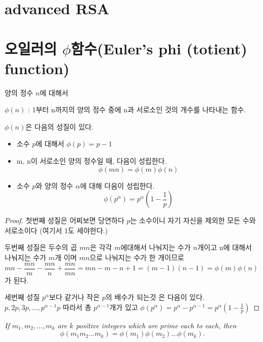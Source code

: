 \section{advanced RSA}

\section{오일러의 $\phi$함수(Euler’s phi (totient) function)}
\begin{dfn}
    양의 정수 $n$에 대해서 

    $\phi (n)$ : 1부터 n까지의 양의 정수 중에 n과 서로소인 것의 개수를 나타내는 함수.    
\end{dfn}

$\phi (n)$은 다음의 성질이 있다.

\begin{theorem}
    \begin{itemize}
        \item{소수 $p$에 대해서  $\phi (p)=p-1$}
        
        \item{ m, n이 서로소인 양의 정수일 때, 다음이 성립한다. \[\phi (mn)=\phi (m)\phi (n)\]}
        
        \item 소수 $p$와 양의 정수 $\alpha$에 대해 다음이 성립한다.
        $$\phi(p^\alpha) = p^\alpha \left ( 1 - \frac{1}{p} \right )$$
        \end{itemize}
\end{theorem}

\begin{proof}

첫번째 성질은 어찌보면 당연하다 $p$는 소수이니 자기 자신을 제외한 모든 수와 서로소이다 (여기서 1도 세야한다.)


두번째 성질은 두수의 곱 $mn$은 각각 $m$에대해서 나눠지는 수가 $n$개이고 n에 대해서 나눠지는 수가 $m$개 이며 $mn$으로 나눠지는 수가 한 개이므로 
$mn -\dfrac{mn}{m}-\dfrac{mn}{n}+\dfrac{mn}{mn} =mn -m -n +1=(m-1)(n-1)=\phi (m)\phi(n)$가 된다.

세번째 성질 $p^\alpha$보다 같거나 작은 $p$의 배수가 되는것 은 다음이 있다.
$p , 2p , 3p , ... , p^{\alpha-1}p$
따라서 총 $p^{\alpha-1}$개가 있고 
$ \phi(p^\alpha) =p^{\alpha} -  p^{\alpha-1} = p^\alpha \left ( 1 - \frac{1}{p} \right )$

\end{proof}

\begin{corollary}
    \emph{If $m_1, m_2, \ldots, m_k$ are $k$ positive
    integers which are prime each to each, then}
    \begin{equation*}
    \phi(m_1 m_2 \ldots m_k) = \phi(m_1) \phi(m_2) \ldots \phi(m_k).
    \end{equation*}
\end{corollary}


